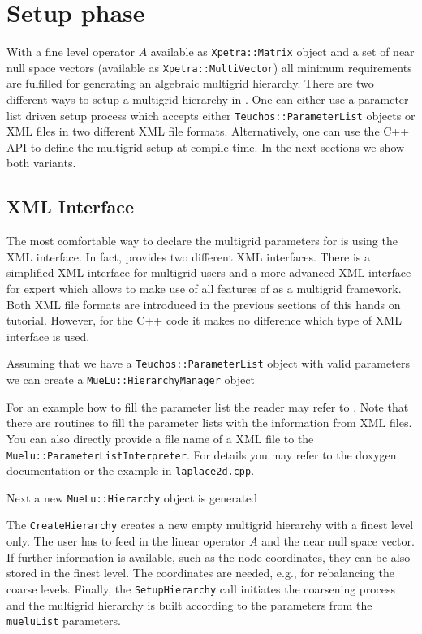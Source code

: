 \documentclass[10pt,fleqn]{book}
\providecommand\printCppListing[1]{

}
\begin{document}
\section{Setup phase}

With a fine level operator $A$ available as \texttt{Xpetra::Matrix} object and a set of near null space vectors (available as \texttt{Xpetra::MultiVector}) all minimum requirements are fulfilled for generating an algebraic multigrid hierarchy. There are two different ways to setup a multigrid hierarchy in \muelu. One can either use a parameter list driven setup process which accepts either \texttt{Teuchos::ParameterList} objects or XML files in two different XML file formats. Alternatively, one can use the \muelu C++ API to define the multigrid setup at compile time. In the next sections we show both variants.

\subsection{XML Interface}

The most comfortable way to declare the multigrid parameters for \muelu is using the XML interface. In fact, \muelu provides two different XML interfaces. There is a simplified XML interface for multigrid users and a more advanced XML interface for expert which allows to make use of all features of \muelu as a multigrid framework. Both XML file formats are introduced in the previous sections of this hands on tutorial.
However, for the C++ code it makes no difference which type of XML interface is used.

Assuming that we have a \texttt{Teuchos::ParameterList} object with valid \muelu parameters we can create a \texttt{MueLu::HierarchyManager} object
\printCppListing{ScalingTestParamList.cpp_2.fragment}
For an example how to fill the parameter list the reader may refer to \cite[Section 2.3]{Mue}. Note that there are routines to fill the parameter lists with the information from XML files. You can also directly provide a file name of a XML file to the \texttt{Muelu::ParameterListInterpreter}. For details you may refer to the doxygen documentation or the example in \texttt{laplace2d.cpp}.

Next a new \texttt{MueLu::Hierarchy} object is generated
\printCppListing{ScalingTestParamList.cpp_4.fragment}
The \texttt{CreateHierarchy} creates a new empty multigrid hierarchy with a finest level only. The user has to feed in the linear operator $A$ and the near null space vector. If further information is available, such as the node coordinates, they can be also stored in the finest level. The coordinates are needed, e.g., for rebalancing the coarse levels.
Finally, the \texttt{SetupHierarchy} call initiates the coarsening process and the multigrid hierarchy is built according to the parameters from the \texttt{mueluList} parameters.
\printCppListing{ScalingTestParamList.cpp_6.fragment}
\end{document}
